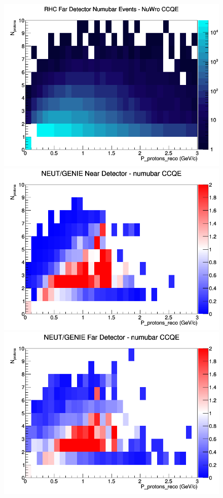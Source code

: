 \begin{figure}[h]
\endminipage
{}
\includegraphics[width=\linewidth]{eff_N_P/GAr/protons/CCQE_RHC_FD_numubar_N_P_NuWro.png}
\endminipage
\newline
{}
\includegraphics[width=\linewidth]{eff_N_P/GAr/protons/ratios/CCQE_NEUT_GENIE_numubar_near_N_P.png}
\endminipage
{}
\includegraphics[width=\linewidth]{eff_N_P/GAr/protons/ratios/CCQE_NEUT_GENIE_numubar_far_N_P.png}

\end{figure}
